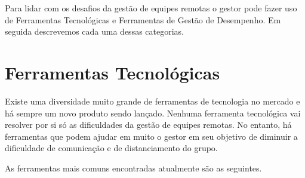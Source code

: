 \documentclass[12pt]{article} %
\begin{document}
Para lidar com os desafios da gestão de equipes remotas o gestor pode fazer uso de Ferramentas Tecnológicas
e Ferramentas de Gestão de Desempenho. Em seguida descrevemos cada uma dessas categorias.

\section{\fontsize{12}{12}\textbf{Ferramentas Tecnológicas}}

Existe uma diversidade muito grande de ferramentas de tecnologia no mercado e há sempre um novo
produto sendo lançado. Nenhuma ferramenta tecnológica vai resolver por si só as dificuldades
da gestão de equipes remotas. No entanto, há ferramentas que podem ajudar em muito o gestor
em seu objetivo de diminuir a dificuldade de comunicação e de distanciamento do grupo.

As ferramentas mais comuns encontradas atualmente são as seguintes.
\end{document}
